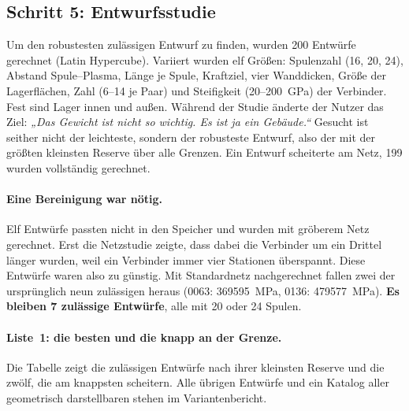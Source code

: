 \subsection*{Schritt 5: Entwurfsstudie}
Um den robustesten zulässigen Entwurf zu finden, wurden 200 Entwürfe gerechnet (Latin Hypercube). Variiert wurden elf
Größen: Spulenzahl (16, 20, 24), Abstand Spule--Plasma, Länge je Spule, Kraftziel, vier Wanddicken, Größe der
Lagerflächen, Zahl (6--14 je Paar) und Steifigkeit (20--200~GPa) der Verbinder. Fest sind Lager innen und außen.
Während der Studie änderte der Nutzer das Ziel: \emph{„Das Gewicht ist nicht so wichtig. Es ist ja ein Gebäude.“}
Gesucht ist seither nicht der leichteste, sondern der robusteste Entwurf, also der mit der größten kleinsten Reserve
über alle Grenzen. Ein Entwurf scheiterte am Netz, 199 wurden vollständig gerechnet.


\paragraph{Eine Bereinigung war nötig.} Elf Entwürfe passten nicht in den Speicher und wurden mit gröberem Netz
gerechnet. Erst die Netzstudie zeigte, dass dabei die Verbinder um ein Drittel länger wurden, weil ein Verbinder immer
vier Stationen überspannt. Diese Entwürfe waren also zu günstig. Mit Standardnetz nachgerechnet fallen zwei der
ursprünglich neun zulässigen heraus (0063: \SI{369}{\to}\SI{595}{MPa}, 0136: \SI{479}{\to}\SI{577}{MPa}).
\textbf{Es bleiben 7 zulässige Entwürfe}, alle mit 20 oder 24 Spulen.

\paragraph{Liste~1: die besten und die knapp an der Grenze.} Die Tabelle zeigt die zulässigen Entwürfe nach ihrer
kleinsten Reserve und die zwölf, die am knappsten scheitern. Alle übrigen Entwürfe und ein Katalog aller geometrisch
darstellbaren stehen im Variantenbericht.
\begin{table}[H]\centering\scriptsize
\caption{Rangliste (bereinigt). $^\ast$ = mit Standardnetz nachgerechnet.}\end{table}

